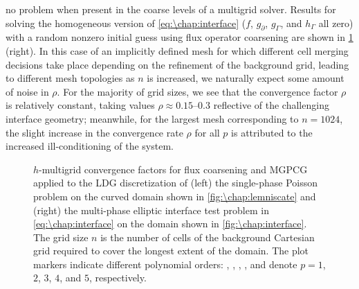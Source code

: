 no problem when present in the coarse levels of a multigrid solver. Results for solving the homogeneous version of \cref{eq:\chap:interface} ($f$, $g_\partial$, $g_\Gamma$, and $h_\Gamma$ all zero) with a random nonzero initial guess using flux operator coarsening are shown in \cref{fig:\chap:implicit_results} (right). In this case of an implicitly defined mesh for which different cell merging decisions take place depending on the refinement of the background grid, leading to different mesh topologies as $n$ is increased, we naturally expect some amount of noise in $\rho$. For the majority of grid sizes, we see that the convergence factor $\rho$ is relatively constant, taking values $\rho \approx 0.15$--$0.3$ reflective of the challenging interface geometry; meanwhile, for the largest mesh corresponding to $n = 1024$, the slight increase in the convergence rate $\rho$ for all $p$ is attributed to the increased ill-conditioning of the system.

\begin{figure}
  \begin{center}
    \footnotesize
    \scalebox{0.9}{}
  \end{center}\vspace{-1em}
  \caption{$h$-multigrid convergence factors for flux coarsening and MGPCG applied to the LDG discretization of (left) the single-phase Poisson problem on the curved domain shown in \cref{fig:\chap:lemniscate} and (right) the multi-phase elliptic interface test problem in \cref{eq:\chap:interface} on the domain shown in \cref{fig:\chap:interface}. The grid size $n$ is the number of cells of the background Cartesian grid required to cover the longest extent of the domain. The plot markers indicate different polynomial orders: \squaresymbol, \bulletsymbol, \trianglesymbol, \xsymbol, and \diamondsymbol denote $p=1$, $2$, $3$, $4$, and $5$, respectively.\vspace{-2em}}
   \label{fig:\chap:implicit_results}
\end{figure}

